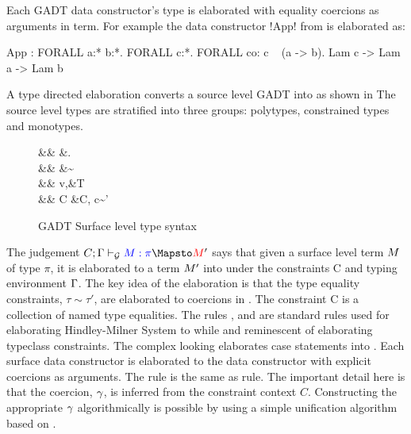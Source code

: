\documentclass[manuscript,screen,nonacm]{acmart}
\begin{document}
Each GADT data constructor's type is elaborated with equality coercions as arguments in \SFC term.
For example the data constructor !App! from  is elaborated as:
\begin{code}
  App : FORALL a:* b:*. FORALL c:*. FORALL co: c ~ (a -> b). Lam c -> Lam a -> Lam b
\end{code}
A type directed elaboration converts a source level GADT into \SFC as shown in 
The source level types are stratified into three groups: polytypes, constrained types and monotypes.
\begin{figure}[ht]
  \centering
  \begin{syntax}
             && \pi   &\bnfeq \eta \bnfor \Forall\alpha.\pi\\
     && \eta  &\bnfeq \tau \bnfor \tau\sim\tau \then \eta\\
             && v,\tau  &\bnfeq \alpha \bnfor \tau\to\tau \bnfor T\App\many\tau\\
           && C     &\bnfeq \empt \bnfor C, c\co\tau\sim\tau'
  \end{syntax}
  \caption{GADT Surface level type syntax}
  \label{fig:gadt-type-syntax}
\end{figure}
The judgement $\GTranslate C \TEnv \Tm \pi \Tm'$ says that given a surface level term $M$ of type $\pi$, it is elaborated to a term $M'$ into \SFC under the constraints C and typing environment $\Gamma$. The key idea of the elaboration is that the type equality constraints, $\tau\sim\tau'$, are elaborated to coercions in \SFC. The constraint C is a collection of named type equalities. The rules ,  and  are standard rules used for elaborating Hindley-Milner System to \SF while  and  reminescent of elaborating typeclass constraints. The complex looking  elaborates case statements into \SFC. Each surface data constructor is elaborated to the \SFC data constructor with explicit coercions as arguments. The rule  is the same as  rule. The important detail here is that the coercion, $\gamma$, is inferred from the constraint context $C$. Constructing the appropriate $\gamma$ algorithmically is possible by using a simple unification algorithm based on \cite{lassez_unification_1988}.
\end{document}
